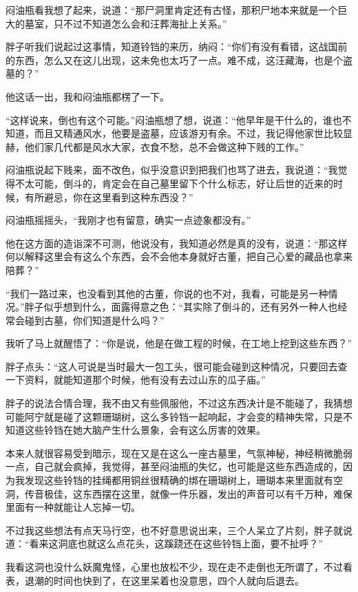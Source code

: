 闷油瓶看我想了起来，说道：“那尸洞里肯定还有古怪，那积尸地本来就是一个巨大的墓室，只不过不知道怎么会和汪葬海扯上关系。”

胖子听我们说起过这事情，知道铃铛的来历，纳闷：“你们有没有看错，这战国前的东西，怎么又在这儿出现，这未免也太巧了一点。难不成，这汪藏海，也是个盗墓的？”

他这话一出，我和闷油瓶都楞了一下。

“这样说来，倒也有这个可能。”闷油瓶想了想，说道：“他早年是干什么的，谁也不知道，而且又精通风水，他要是盗墓，应该游刃有余。不过，我记得他家世比较显赫，他们家几代都是风水大家，衣食不愁，总不会做这种下贱的工作。”

闷油瓶说起下贱来，面不改色，似乎没意识到把我们也骂了进去，我说道：“我觉得不太可能，倒斗的，肯定会在自己墓里留下个什么标志，好让后世的近来的时候，有所避忌，你在这里看到这种东西没？”

闷油瓶摇摇头，“我刚才也有留意，确实一点迹象都没有。”

他在这方面的造诣深不可测，他说没有，我知道必然是真的没有，说道：“那这样何以解释这里会有这么个东西，会不会他本身就好古董，把自己心爱的藏品也拿来陪葬？”

“我们一路过来，也没看到其他的古董，你说的也不对，我看，可能是另一种情况。”胖子似乎想到什么，面露得意之色：“其实除了倒斗的，还有另外一种人也经常会碰到古墓，你们知道是什么吗？”

我听了马上就醒悟了：“你是说，他是在做工程的时候，在工地上挖到这些东西？”

胖子点头：“这人可说是当时最大一包工头，很可能会碰到这种情况，只要回去查一下资料，就能知道那个时候，他有没有去过山东的瓜子庙。”

胖子的说法合情合理，我不由又有些佩服他，不过这东西决计是不能碰了，我猜想可能阿宁就是碰了这颗珊瑚树，这么多铃铛一起响起，才会变的精神失常，只是不知道这些铃铛在她大脑产生什么景象，会有这么厉害的效果。

本来人就很容易受到暗示，现在又是在这么一座古墓里，气氛神秘，神经稍微脆弱一点，自己就会疯掉，我觉得，甚至闷油瓶的失忆，也可能是这些东西造成的，因为我发现这些铃铛的挂绳都用铜丝很精确的绑在珊瑚树上，珊瑚本来里面就有空洞，传音极佳，这东西摆在这里，就像一件乐器，发出的声音可以有千万种，难保里面有一种就能让人忘掉一切。

不过我这些想法有点天马行空，也不好意思说出来，三个人呆立了片刻，胖子就说道：“看来这洞底也就这么点花头，这蹊跷还在这些铃铛上面，要不扯呼？”

我看这洞也没什么妖魔鬼怪，心里也放松不少，现在走不走倒也无所谓了，不过看表，退潮的时间也快到了，在这里呆着也没意思，四个人就向后退去。

